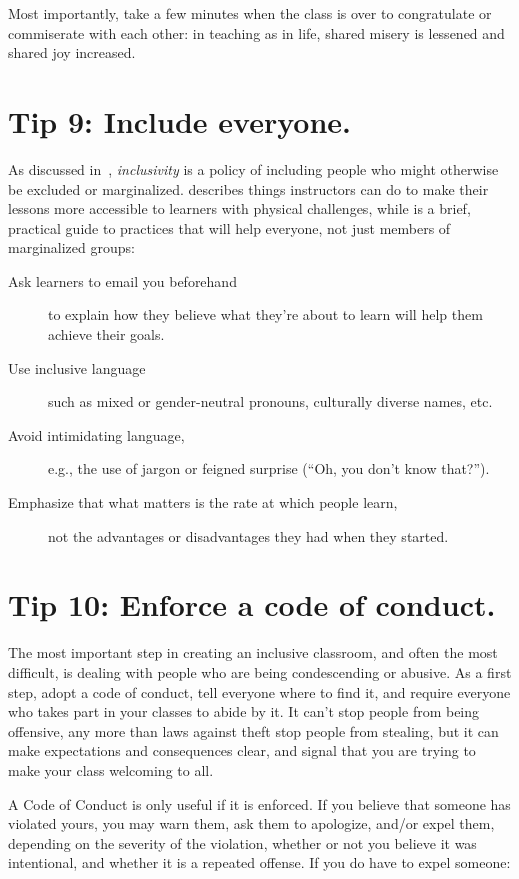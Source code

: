 \documentclass[10pt,letterpaper]{article}
\newcommand{\rulemajor}[1]{\section{#1}}
\begin{document}
Most importantly,
take a few minutes when the class is over to congratulate or commiserate with each other:
in teaching as in life,
shared misery is lessened and shared joy increased.

\rulemajor{Tip 9: Include everyone.}

As discussed in~\cite{Wils2019},
\emph{inclusivity} is a policy of including people who might otherwise be excluded or marginalized.
\cite{Burg2015} describes things instructors can do to make their lessons more accessible
to learners with physical challenges,
while \cite{Lee2017} is a brief, practical guide to practices that will help everyone,
not just members of marginalized groups:

\begin{description}

\item[Ask learners to email you beforehand]
  to explain how they believe what they're about to learn will help them achieve their goals.

\item[Use inclusive language]
  such as mixed or gender-neutral pronouns, culturally diverse names, etc.

\item[Avoid intimidating language,]
  e.g., the use of jargon or feigned surprise (``Oh, you don't know that?'').

\item[Emphasize that what matters is the rate at which people learn,]
  not the advantages or disadvantages they had when they started.

\end{description}

\rulemajor{Tip 10: Enforce a code of conduct.}

The most important step in creating an inclusive classroom,
and often the most difficult,
is dealing with people who are being condescending or abusive.
As a first step,
adopt a code of conduct,
tell everyone where to find it,
and require everyone who takes part in your classes to abide by it.
It can't stop people from being offensive,
any more than laws against theft stop people from stealing,
but it can make expectations and consequences clear,
and signal that you are trying to make your class welcoming to all.

A Code of Conduct is only useful if it is enforced.
If you believe that someone has violated yours,
you may warn them,
ask them to apologize,
and/or expel them,
depending on the severity of the violation,
whether or not you believe it was intentional,
and whether it is a repeated offense.
If you do have to expel someone:
\end{document}
